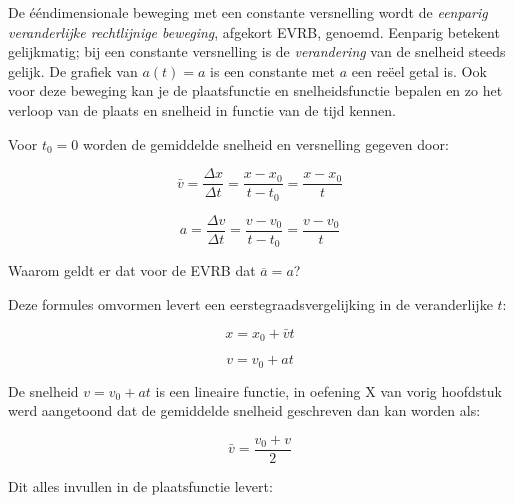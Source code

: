 \documentclass{ximera}
\begin{document}
	\author{Bart Lambregs}
    \xmsource\xmuitleg



De ééndimensionale beweging met een constante  versnelling wordt de \textit{eenparig veranderlijke rechtlijnige beweging}, afgekort EVRB, genoemd. 
Eenparig betekent gelijkmatig; bij een constante versnelling is de \textit{verandering} van de snelheid steeds gelijk.
De grafiek van $a(t)=a$ is een constante met $a$ een reëel getal is.
Ook voor deze beweging kan je de plaatsfunctie en snelheidsfunctie bepalen en zo het verloop van de plaats en snelheid in functie van de tijd kennen. 




Voor \(t_0 = 0\) worden de gemiddelde snelheid en versnelling gegeven door: 

\[
\bar{v} = \frac{\Delta x}{\Delta t} = \frac{x - x_0}{t - t_0} = \frac{x - x_0}{t}
\]

\[
a = \frac{\Delta v}{\Delta t} = \frac{v - v_0}{t - t_0} = \frac{v - v_0}{t}
\]


\begin{quickquestion*}
Waarom geldt er dat voor de EVRB dat \( \overline{a} = a\)? 
\end{quickquestion*}

Deze formules omvormen levert een eerstegraadsvergelijking in de veranderlijke \(t\): 

\[
x = x_0 + \bar{v}t 
\]

\[
v = v_0 + at 
\]


De snelheid \(v = v_0 + at \) is een lineaire functie, in oefening X van vorig hoofdstuk werd aangetoond dat de gemiddelde snelheid geschreven dan kan worden als: 

\[
\bar{v} = \frac{v_0 + v}{2} 
\]



Dit alles invullen in de plaatsfunctie levert: 
\end{document}

